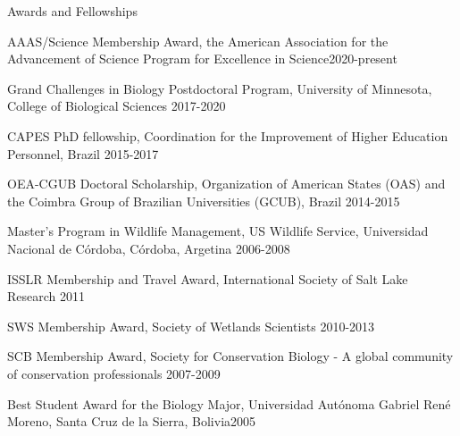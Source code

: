 \documentclass{resume} %
\begin{document}
\begin{rSection}{Awards and Fellowships}
\begin{esSubsection}{AAAS/Science Membership Award,}{ the American Association for the Advancement of Science Program for Excellence in Science}{2020-present}{}{}
\end{esSubsection}
\begin{esSubsection}{Grand Challenges in Biology Postdoctoral Program,}{ University of Minnesota, College of Biological Sciences }{2017-2020}{}{}
\end{esSubsection}
\begin{esSubsection}{CAPES PhD fellowship,}{ Coordination for the Improvement of Higher Education Personnel, Brazil }{2015-2017}{}{}
\end{esSubsection}
\begin{esSubsection}{OEA-CGUB Doctoral Scholarship,}{ Organization of American States (OAS) and the Coimbra Group of Brazilian Universities (GCUB), Brazil }{2014-2015}{}{}
\end{esSubsection}
\begin{esSubsection}{Master’s Program in Wildlife Management,}{ US Wildlife Service, Universidad Nacional de Córdoba, Córdoba, Argetina }{2006-2008}{}{}
\end{esSubsection}
\begin{esSubsection}{ISSLR Membership and Travel Award,}{ International Society of Salt Lake Research }{2011}{}{}
\end{esSubsection}
\begin{esSubsection}{SWS Membership Award,}{ Society of Wetlands Scientists }{2010-2013}{}{}
\end{esSubsection}
\begin{esSubsection}{SCB Membership Award,}{ Society for Conservation Biology - A global community of conservation professionals }{2007-2009}{}{}
\end{esSubsection}
\begin{esSubsection}{Best Student Award for the Biology Major,}{ Universidad Autónoma Gabriel René Moreno, Santa Cruz de la Sierra, Bolivia}{2005}{}{}
\end{esSubsection}{}
\end{rSection}


\end{document}
